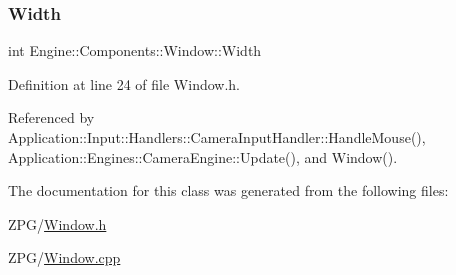 \subsubsection{\texorpdfstring{Width}{Width}}
{\footnotesize\ttfamily int Engine\+::\+Components\+::\+Window\+::\+Width}



Definition at line 24 of file Window.\+h.



Referenced by Application\+::\+Input\+::\+Handlers\+::\+Camera\+Input\+Handler\+::\+Handle\+Mouse(), Application\+::\+Engines\+::\+Camera\+Engine\+::\+Update(), and Window().



The documentation for this class was generated from the following files\+:\begin{DoxyCompactItemize}
\item 
Z\+P\+G/\mbox{\hyperlink{Window_8h}{Window.\+h}}\item 
Z\+P\+G/\mbox{\hyperlink{Window_8cpp}{Window.\+cpp}}\end{DoxyCompactItemize}
